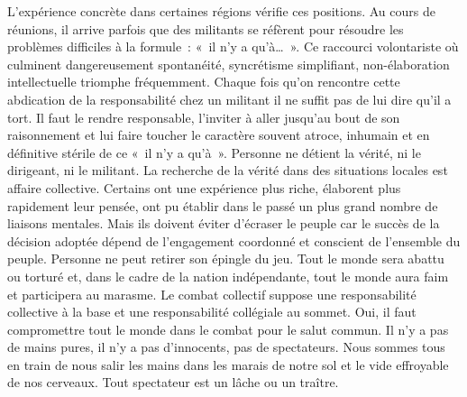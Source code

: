 \documentclass[french,twoside]{book} %
\begin{document}
\bigbreak
\noindent L’expérience concrète dans certaines régions vérifie ces positions. Au cours de réunions, il arrive parfois que des militants se réfèrent pour résoudre les problèmes difficiles à la formule : « il n’y a qu’à… ». Ce raccourci volontariste où culminent dangereusement spontanéité, syncrétisme simplifiant, non-élaboration intellectuelle triomphe fréquemment. Chaque fois qu’on rencontre cette abdication de la responsabilité chez un militant il ne suffit pas de lui dire qu’il a tort. Il faut le rendre responsable, l’inviter à aller jusqu’au bout de son raisonnement et lui faire   toucher le caractère souvent atroce, inhumain et en définitive stérile de ce « il n’y a qu’à ». Personne ne détient la vérité, ni le dirigeant, ni le militant. La recherche de la vérité dans des situations locales est affaire collective. Certains ont une expérience plus riche, élaborent plus rapidement leur pensée, ont pu établir dans le passé un plus grand nombre de liaisons mentales. Mais ils doivent éviter d’écraser le peuple car le succès de la décision adoptée dépend de l’engagement coordonné et conscient de l’ensemble du peuple. Personne ne peut retirer son épingle du jeu. Tout le monde sera abattu ou torturé et, dans le cadre de la nation indépendante, tout le monde aura faim et participera au marasme. Le combat collectif suppose une responsabilité collective à la base et une responsabilité collégiale au sommet. Oui, il faut compromettre tout le monde dans le combat pour le salut commun. Il n’y a pas de mains pures, il n’y a pas d’innocents, pas de spectateurs. Nous sommes tous en train de nous salir les mains dans les marais de notre sol et le vide effroyable de nos cerveaux. Tout spectateur est un lâche ou un traître.\par
\bigbreak
\end{document}
